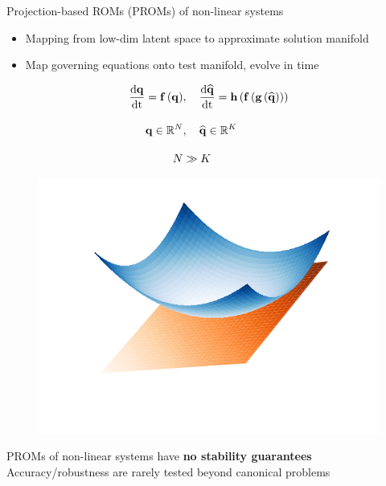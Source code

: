 \documentclass[]{beamer}
\begin{document}
\begin{frame}{Projection-based ROMs (PROMs) of non-linear systems}
    \begin{itemize}
        \item Mapping from low-dim latent space to approximate solution manifold
        \item Map governing equations onto test manifold, evolve in time
    \end{itemize}
	\centering
	\begin{minipage}{0.49\linewidth}
		\centering
		\vspace{-2em}
		\begin{align*}
			\frac{\text{d} \mathbf{q}}{\text{d} \text{t}} = \mathbf{f} \left(\mathbf{q}\right)&, \quad \frac{\text{d} \mathbf{\widehat{q}}}{\text{d} \text{t}} = \mathbf{h}\left(\mathbf{f} \left(\mathbf{g}\left(\mathbf{\widehat{q}}\right)\right)\right) \\[1em]
			\mathbf{q} \in \mathbb{R}^{N}&, \quad \mathbf{\widehat{q}} \in \mathbb{R}^{K} \\[1em]
			N &\gg K
		\end{align*}
	\end{minipage}
	\hspace{-2em}
	\begin{minipage}{0.49\linewidth}
		\begin{figure}
			\includegraphics[width=0.99\linewidth,trim={2em 2em 2em 2em},clip]{theory/tangentPlane.png}
		\end{figure}
	\end{minipage}
	\begin{tcolorbox}[colframe=blue!50!white,halign=center]
		PROMs of non-linear systems have \textbf{no stability guarantees} \\
		Accuracy/robustness are rarely tested beyond canonical problems
	\end{tcolorbox}
\end{frame}
\end{document}
